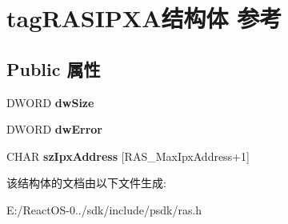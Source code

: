 \hypertarget{structtag_r_a_s_i_p_x_a}{}\section{tag\+R\+A\+S\+I\+P\+X\+A结构体 参考}
\label{structtag_r_a_s_i_p_x_a}
\subsection*{Public 属性}
\begin{DoxyCompactItemize}
\item 
\mbox{\label{structtag_r_a_s_i_p_x_a_aca99758257518acadc28cd2ffc3c917a}} 
D\+W\+O\+RD {\bfseries dw\+Size}
\item 
\mbox{\label{structtag_r_a_s_i_p_x_a_adb7332430f022f19e124c7686f5c57d4}} 
D\+W\+O\+RD {\bfseries dw\+Error}
\item 
\mbox{\label{structtag_r_a_s_i_p_x_a_a96f988d473f9c892f0b842838b0af2b8}} 
C\+H\+AR {\bfseries sz\+Ipx\+Address} \mbox{[}R\+A\+S\+\_\+\+Max\+Ipx\+Address+1\mbox{]}
\end{DoxyCompactItemize}


该结构体的文档由以下文件生成\+:\begin{DoxyCompactItemize}
\item 
E\+:/\+React\+O\+S-\/0../sdk/include/psdk/ras.\+h\end{DoxyCompactItemize}

